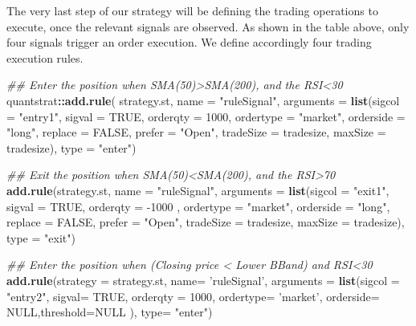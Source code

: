 \documentclass[
  11pt,
]{article}
\newenvironment{Shaded}{\begin{snugshade}}{\end{snugshade}}
\newcommand{\CommentTok}[1]{\textcolor[rgb]{0.56,0.35,0.01}{\textit{#1}}}
\newcommand{\DataTypeTok}[1]{\textcolor[rgb]{0.13,0.29,0.53}{#1}}
\newcommand{\DecValTok}[1]{\textcolor[rgb]{0.00,0.00,0.81}{#1}}
\newcommand{\KeywordTok}[1]{\textcolor[rgb]{0.13,0.29,0.53}{\textbf{#1}}}
\newcommand{\NormalTok}[1]{#1}
\newcommand{\OperatorTok}[1]{\textcolor[rgb]{0.81,0.36,0.00}{\textbf{#1}}}
\newcommand{\OtherTok}[1]{\textcolor[rgb]{0.56,0.35,0.01}{#1}}
\newcommand{\StringTok}[1]{\textcolor[rgb]{0.31,0.60,0.02}{#1}}
\begin{document}
The very last step of our strategy will be defining the trading
operations to execute, once the relevant signals are observed. As shown
in the table above, only four signals trigger an order execution. We
define accordingly four trading execution rules.

\begin{Shaded}
\begin{Highlighting}[]
\CommentTok{## Enter the position when SMA(50)>SMA(200), and the RSI<30}
\NormalTok{quantstrat}\OperatorTok{::}\KeywordTok{add.rule}\NormalTok{(}
\NormalTok{  strategy.st, }\DataTypeTok{name =} \StringTok{"ruleSignal"}\NormalTok{,}
         \DataTypeTok{arguments =} \KeywordTok{list}\NormalTok{(}\DataTypeTok{sigcol =} \StringTok{"entry1"}\NormalTok{, }\DataTypeTok{sigval =} \OtherTok{TRUE}\NormalTok{,}
                          \DataTypeTok{orderqty =} \DecValTok{1000}\NormalTok{, }\DataTypeTok{ordertype =} \StringTok{"market"}\NormalTok{,}
                          \DataTypeTok{orderside =} \StringTok{"long"}\NormalTok{, }\DataTypeTok{replace =} \OtherTok{FALSE}\NormalTok{,}
                          \DataTypeTok{prefer =} \StringTok{"Open"}\NormalTok{, }
                          \DataTypeTok{tradeSize =}\NormalTok{ tradesize, }\DataTypeTok{maxSize =}\NormalTok{ tradesize),}
         \DataTypeTok{type =} \StringTok{"enter"}\NormalTok{)  }


\CommentTok{## Exit the position when SMA(50)<SMA(200), and the RSI>70}
\KeywordTok{add.rule}\NormalTok{(strategy.st, }\DataTypeTok{name =} \StringTok{"ruleSignal"}\NormalTok{,}
         \DataTypeTok{arguments =} \KeywordTok{list}\NormalTok{(}\DataTypeTok{sigcol =} \StringTok{"exit1"}\NormalTok{, }\DataTypeTok{sigval =} \OtherTok{TRUE}\NormalTok{,}
                          \DataTypeTok{orderqty =} \DecValTok{-1000}\NormalTok{ , }\DataTypeTok{ordertype =} \StringTok{"market"}\NormalTok{,}
                          \DataTypeTok{orderside =} \StringTok{"long"}\NormalTok{, }\DataTypeTok{replace =} \OtherTok{FALSE}\NormalTok{,}
                          \DataTypeTok{prefer =} \StringTok{"Open"}\NormalTok{, }
                          \DataTypeTok{tradeSize =}\NormalTok{ tradesize, }
                          \DataTypeTok{maxSize =}\NormalTok{ tradesize),}
         \DataTypeTok{type =} \StringTok{"exit"}\NormalTok{) }


\CommentTok{## Enter the position when (Closing price < Lower BBand) and RSI<30}
\KeywordTok{add.rule}\NormalTok{(}\DataTypeTok{strategy =}\NormalTok{ strategy.st, }\DataTypeTok{name=} \StringTok{'ruleSignal'}\NormalTok{,}
         \DataTypeTok{arguments =} \KeywordTok{list}\NormalTok{(}\DataTypeTok{sigcol =} \StringTok{"entry2"}\NormalTok{, }\DataTypeTok{sigval=} \OtherTok{TRUE}\NormalTok{,}
                          \DataTypeTok{orderqty =} \DecValTok{1000}\NormalTok{, }\DataTypeTok{ordertype=} \StringTok{'market'}\NormalTok{, }
                          \DataTypeTok{orderside=} \OtherTok{NULL}\NormalTok{,}\DataTypeTok{threshold=}\OtherTok{NULL}\NormalTok{ ), }
         \DataTypeTok{type=} \StringTok{"enter"}\NormalTok{)}



\end{Highlighting}
\end{Shaded}
\end{document}
